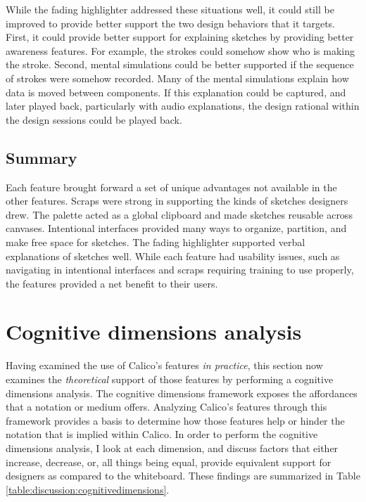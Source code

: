 \documentclass[12pt,fleqn]{ucithesis}
\begin{document}
While the fading highlighter addressed these situations well, it could still be improved to provide better support the two design behaviors that it targets. First, it could provide better support for explaining sketches by providing better awareness features. For example, the strokes could somehow show who is making the stroke. Second, mental simulations could be better supported if the sequence of strokes were somehow recorded. Many of the mental simulations explain how data is moved between components. If this explanation could be captured, and later played back, particularly with audio explanations, the design rational within the design sessions could be played back.

\subsection{Summary}

Each feature brought forward a set of unique advantages not available in the other features. Scraps were strong in supporting the kinds of sketches designers drew. The palette acted as a global clipboard and made sketches reusable across canvases. Intentional interfaces provided many ways to organize, partition, and make free space for sketches. The fading highlighter supported verbal explanations of sketches well. While each feature had usability issues, such as navigating in intentional interfaces and scraps requiring training to use properly, the features provided a net benefit to their users.

\section{Cognitive dimensions analysis}
\label{discussion:cog-dim}

Having examined the use of Calico's features \textit{in practice}, this section now examines the \textit{theoretical} support of those features by performing a cognitive dimensions analysis. The cognitive dimensions framework exposes the affordances that a notation or medium offers. Analyzing Calico's features through this framework provides a basis to determine how those features help or hinder the notation that is implied within Calico. In order to perform the cognitive dimensions analysis, I look at each dimension, and discuss factors that either increase, decrease, or, all things being equal, provide equivalent support for designers as compared to the whiteboard. These findings are summarized in Table \ref{table:discussion:cognitivedimensions}.
\end{document}
